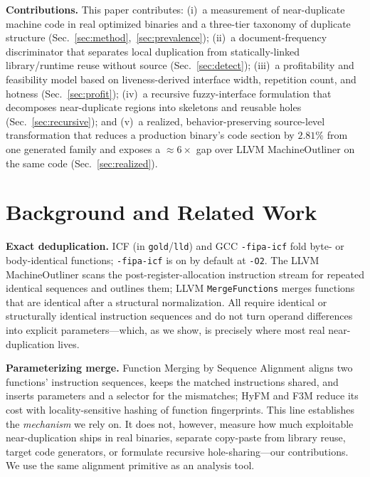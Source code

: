 \documentclass[conference]{IEEEtran}
\begin{document}
\textbf{Contributions.} This paper contributes:
(i)~a measurement of near-duplicate machine code in real optimized binaries
and a three-tier taxonomy of duplicate structure
(Sec.~\ref{sec:method},~\ref{sec:prevalence});
(ii)~a document-frequency discriminator that separates local duplication from
statically-linked library/runtime reuse without source (Sec.~\ref{sec:detect});
(iii)~a profitability and feasibility model based on liveness-derived interface
width, repetition count, and hotness (Sec.~\ref{sec:profit});
(iv)~a recursive fuzzy-interface formulation that decomposes near-duplicate
regions into skeletons and reusable holes (Sec.~\ref{sec:recursive}); and
(v)~a realized, behavior-preserving source-level transformation that reduces a
production binary's code section by $2.81\%$ from one generated family and
exposes a ${\approx}6\times$ gap over LLVM MachineOutliner on the same code
(Sec.~\ref{sec:realized}).

\section{Background and Related Work}
\textbf{Exact deduplication.} ICF (in \texttt{gold}/\texttt{lld}) and GCC
\texttt{-fipa-icf} fold byte- or body-identical functions; \texttt{-fipa-icf}
is on by default at \texttt{-O2}. The LLVM MachineOutliner
\cite{paquette2016outliner} scans the post-register-allocation instruction
stream for repeated identical sequences and outlines them; LLVM
\texttt{MergeFunctions} \cite{llvm_mergefunctions} merges functions that are
identical after a structural normalization. All require identical or
structurally identical instruction sequences and do not turn operand
differences into explicit parameters---which, as we show, is precisely where
most real near-duplication lives.

\textbf{Parameterizing merge.} Function Merging by Sequence Alignment
\cite{rocha2019fmsa} aligns two functions' instruction sequences, keeps the
matched instructions shared, and inserts parameters and a selector for the
mismatches; HyFM \cite{rocha2020hyfm} and F3M \cite{rocha2021f3m} reduce its
cost with locality-sensitive hashing of function fingerprints. This line
establishes the \emph{mechanism} we rely on. It does not, however, measure how
much exploitable near-duplication ships in real binaries, separate copy-paste
from library reuse, target code generators, or formulate recursive
hole-sharing---our contributions. We use the same alignment primitive
\cite{smithwaterman1981} as an analysis tool.
\end{document}
